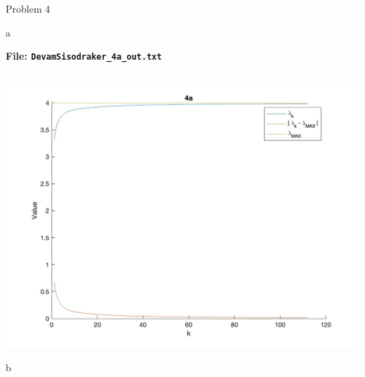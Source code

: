 \begin{section}{Problem 4}
\begin{solution}{a}
        \continued
        
        \begin{mdframed}
            \footnotesize
            \textbf{File: {\tt DevamSisodraker\_4a\_out.txt}}
            \inputminted{matlab}{DevamSisodraker_4a_out.txt}
            \normalfont
        \end{mdframed}

        \continued

        \begin{mdframed}
            \includegraphics[scale=0.33]{DevamSisodraker_4a.jpg}
        \end{mdframed}
    \end{solution}

    \newpage
    
    \begin{solution}{b}
    \end{solution}
\end{section}